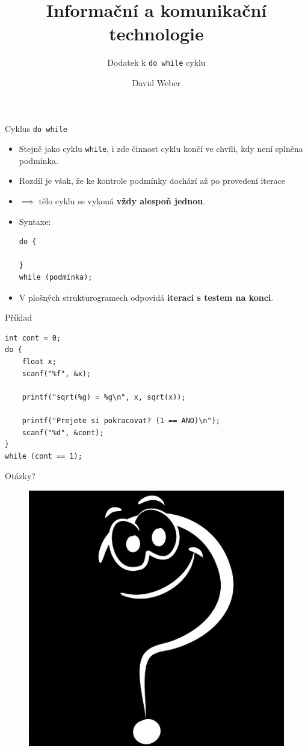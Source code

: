 \documentclass[14pt,aspectratio=169]{beamer}
\title{Informační a komunikační technologie}
\subtitle{Dodatek k \texttt{do while} cyklu}
\author{David Weber}
\begin{document}

    \begin{frame}
        \titlepage
    \end{frame}

    \begin{frame}[t,fragile]{Cyklus \texttt{do while}}
        \begin{itemize}
            \item Stejně jako cyklu \texttt{while}, i zde činnost cyklu končí ve chvíli, kdy není splněna podmínka.
            \item Rozdíl je však, že ke kontrole podmínky dochází až po provedení iterace
            \item $\implies$ tělo cyklu se vykoná \textbf{vždy alespoň jednou}.
            \item Syntaxe:
            \begin{lstlisting}
do {

}
while (podmínka);
            \end{lstlisting}
            \item V plošných strukturogramech odpovídá \textbf{iteraci s testem na konci}.
        \end{itemize}
    \end{frame}

    \begin{frame}[t,fragile]{Příklad}
        \begin{lstlisting}
int cont = 0;
do {
    float x;
    scanf("%f", &x);

    printf("sqrt(%g) = %g\n", x, sqrt(x));

    printf("Prejete si pokracovat? (1 == ANO)\n");
    scanf("%d", &cont);
}
while (cont == 1);
        \end{lstlisting}
    \end{frame}

    \begin{frame}{Otázky?}
        \begin{figure}
            \centering
            \includegraphics[scale=.4]{images/discussion_inverted.png}
        \end{figure}
    \end{frame}
\end{document}
